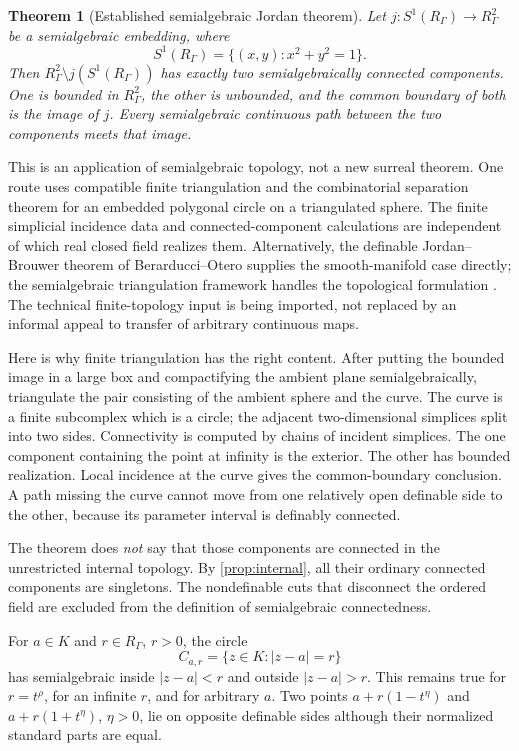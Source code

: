 \documentclass[11pt,letterpaper]{article}
\newtheorem{theorem}{Theorem}[section]
\theoremstyle{definition}
\theoremstyle{remark}
\numberwithin{equation}{section}
\begin{document}
\begin{theorem}[Established semialgebraic Jordan theorem]\label{thm:sajordan}
Let $j:S^1(R_\Gamma)\to R_\Gamma^2$ be a semialgebraic embedding, where
\[
 S^1(R_\Gamma)=\{(x,y):x^2+y^2=1\}.
\]
Then $R_\Gamma^2\setminus j(S^1(R_\Gamma))$ has exactly two semialgebraically connected components. One is bounded in $R_\Gamma^2$, the other is unbounded, and the common boundary of both is the image of $j$. Every semialgebraic continuous path between the two components meets that image.
\end{theorem}

This is an application of semialgebraic topology, not a new surreal theorem. One route uses compatible finite triangulation and the combinatorial separation theorem for an embedded polygonal circle on a triangulated sphere. The finite simplicial incidence data and connected-component calculations are independent of which real closed field realizes them. Alternatively, the definable Jordan--Brouwer theorem of Berarducci--Otero supplies the smooth-manifold case directly; the semialgebraic triangulation framework handles the topological formulation \cite{BCR,BOintersection,BOhomology}. The technical finite-topology input is being imported, not replaced by an informal appeal to transfer of arbitrary continuous maps.

Here is why finite triangulation has the right content. After putting the bounded image in a large box and compactifying the ambient plane semialgebraically, triangulate the pair consisting of the ambient sphere and the curve. The curve is a finite subcomplex which is a circle; the adjacent two-dimensional simplices split into two sides. Connectivity is computed by chains of incident simplices. The one component containing the point at infinity is the exterior. The other has bounded realization. Local incidence at the curve gives the common-boundary conclusion. A path missing the curve cannot move from one relatively open definable side to the other, because its parameter interval is definably connected.

The theorem does \emph{not} say that those components are connected in the unrestricted internal topology. By \cref{prop:internal}, all their ordinary connected components are singletons. The nondefinable cuts that disconnect the ordered field are excluded from the definition of semialgebraic connectedness.

\begin{example}
For $a\in K$ and $r\in R_\Gamma$, $r>0$, the circle
\[
 C_{a,r}=\{z\in K:|z-a|=r\}
\]
has semialgebraic inside $|z-a|<r$ and outside $|z-a|>r$. This remains true for $r=t^\rho$, for an infinite $r$, and for arbitrary $a$. Two points $a+r(1-t^\eta)$ and $a+r(1+t^\eta)$, $\eta>0$, lie on opposite definable sides although their normalized standard parts are equal.
\end{example}
\end{document}
